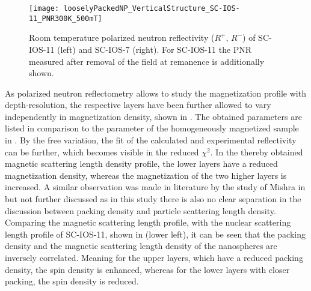 \documentclass[\main/dresen_thesis.tex]{subfiles}
\begin{document}
  \begin{figure}[tb]
    \centering
    \texttt{[image: looselyPackedNP\_VerticalStructure\_SC-IOS-11\_PNR300K\_500mT]}
    \caption{\label{fig:looselyPackedNP:layer:pnrRoomTemperatureMagnetic}Room temperature polarized neutron reflectivity ($R^{+},\, R^{-}$) of SC-IOS-11 (left) and SC-IOS-7 (right). For SC-IOS-11 the PNR measured after removal of the field at remanence is additionally shown.}
  \end{figure}
  As polarized neutron reflectometry allows to study the magnetization profile with depth-resolution, the respective layers have been further allowed to vary independently in magnetization density, shown in .
  The obtained parameters are listed in comparison to the parameter of the homogeneously magnetized sample in .
  By the free variation, the fit of the calculated and experimental reflectivity can be further, which becomes visible in the reduced $\chi^2$.
  In the thereby obtained magnetic scattering length density profile, the lower layers have a reduced magnetization density, whereas the magnetization of the two higher layers is increased.
  A similar observation was made in literature by the study of Mishra \etal in \cite{Mishra_2012_Selfa} but not further discussed as in this study there is also no clear separation in the discussion between packing density and particle scattering length density.
  Comparing the magnetic scattering length profile, with the nuclear scattering length profile of SC-IOS-11, shown in  (lower left), it can be seen that the packing density and the magnetic scattering length density of the nanospheres are inversely correlated.
  Meaning for the upper layers, which have a reduced packing density, the spin density is enhanced, whereas for the lower layers with closer packing, the spin density is reduced.
\end{document}
